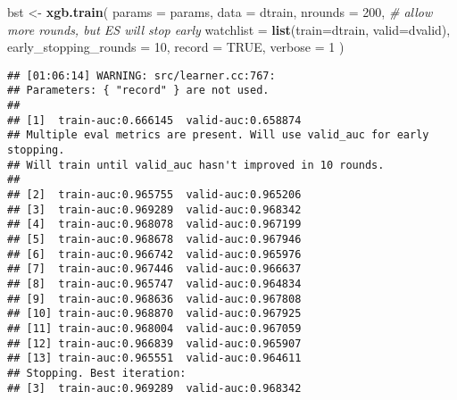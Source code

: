 \documentclass[
]{article}
\newenvironment{Shaded}{\begin{snugshade}}{\end{snugshade}}
\newcommand{\AttributeTok}[1]{\textcolor[rgb]{0.13,0.29,0.53}{#1}}
\newcommand{\CommentTok}[1]{\textcolor[rgb]{0.56,0.35,0.01}{\textit{#1}}}
\newcommand{\ConstantTok}[1]{\textcolor[rgb]{0.56,0.35,0.01}{#1}}
\newcommand{\DecValTok}[1]{\textcolor[rgb]{0.00,0.00,0.81}{#1}}
\newcommand{\FunctionTok}[1]{\textcolor[rgb]{0.13,0.29,0.53}{\textbf{#1}}}
\newcommand{\NormalTok}[1]{#1}
\newcommand{\OtherTok}[1]{\textcolor[rgb]{0.56,0.35,0.01}{#1}}
\begin{document}
\begin{Shaded}
\begin{Highlighting}[]
\NormalTok{bst }\OtherTok{\textless{}{-}} \FunctionTok{xgb.train}\NormalTok{(}
  \AttributeTok{params                =}\NormalTok{ params,}
  \AttributeTok{data                  =}\NormalTok{ dtrain,}
  \AttributeTok{nrounds               =} \DecValTok{200}\NormalTok{,                }\CommentTok{\# allow more rounds, but ES will stop early}
  \AttributeTok{watchlist             =} \FunctionTok{list}\NormalTok{(}\AttributeTok{train=}\NormalTok{dtrain, }\AttributeTok{valid=}\NormalTok{dvalid),}
  \AttributeTok{early\_stopping\_rounds =} \DecValTok{10}\NormalTok{,}
  \AttributeTok{record                =} \ConstantTok{TRUE}\NormalTok{,}
  \AttributeTok{verbose               =} \DecValTok{1}
\NormalTok{)}
\end{Highlighting}
\end{Shaded}

\begin{verbatim}
## [01:06:14] WARNING: src/learner.cc:767: 
## Parameters: { "record" } are not used.
## 
## [1]  train-auc:0.666145  valid-auc:0.658874 
## Multiple eval metrics are present. Will use valid_auc for early stopping.
## Will train until valid_auc hasn't improved in 10 rounds.
## 
## [2]  train-auc:0.965755  valid-auc:0.965206 
## [3]  train-auc:0.969289  valid-auc:0.968342 
## [4]  train-auc:0.968078  valid-auc:0.967199 
## [5]  train-auc:0.968678  valid-auc:0.967946 
## [6]  train-auc:0.966742  valid-auc:0.965976 
## [7]  train-auc:0.967446  valid-auc:0.966637 
## [8]  train-auc:0.965747  valid-auc:0.964834 
## [9]  train-auc:0.968636  valid-auc:0.967808 
## [10] train-auc:0.968870  valid-auc:0.967925 
## [11] train-auc:0.968004  valid-auc:0.967059 
## [12] train-auc:0.966839  valid-auc:0.965907 
## [13] train-auc:0.965551  valid-auc:0.964611 
## Stopping. Best iteration:
## [3]  train-auc:0.969289  valid-auc:0.968342
\end{verbatim}
\end{document}
